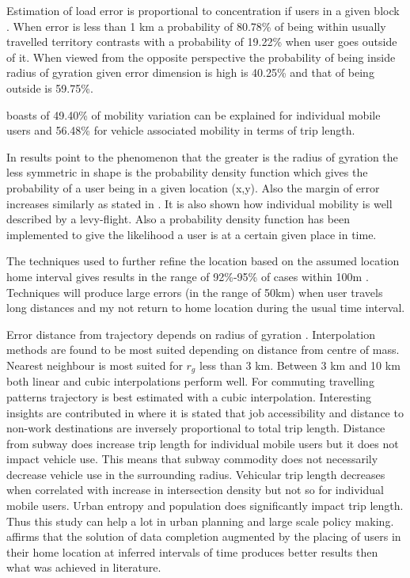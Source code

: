 \documentclass[12pt, a4paper]{report}
\theoremstyle{definition}
\theoremstyle{definition}%
\theoremstyle{definition}%
\theoremstyle{definition}%
\theoremstyle{definition}%
\theoremstyle{definition}%
\begin{document}
Estimation of load error is proportional to concentration if users in a given block \cite{Hoteit2014}. When error is less than 1 km a probability of 80.78\% of being within usually travelled territory contrasts with a probability of 19.22\% when user goes outside of it. When viewed from the opposite perspective the probability of being inside radius of gyration given error dimension is high is 40.25\% and that of being outside is 59.75\%.

\cite{Calabrese2013} boasts of 49.40\% of mobility variation can be explained for individual mobile users and 56.48\% for vehicle associated mobility in terms of trip length.    

In \cite{Gonzalez2008} results point to the phenomenon that the greater is the radius of gyration the less symmetric in shape is the probability density function which gives the probability of a user being in a given location (x,y). Also the margin of error increases similarly as stated in \cite{Hoteit2014}. It is also shown how individual mobility is well described by a levy-flight. Also a probability density function has been implemented to give the likelihood a user is at a certain given place in time.

The techniques used to further refine the location based on the assumed location home interval gives results in the range of 92\%-95\% of cases within 100m \cite{Hoteit2016}. Techniques will produce large errors (in the range of 50km) when user travels long distances and my not return to home location during the usual time interval.

Error distance from trajectory depends on radius of gyration \cite{Hoteit2014}. Interpolation methods are found to be most suited depending on distance from centre of mass. Nearest neighbour is most suited for $r_{g}$ less than 3 km. Between 3 km and 10 km both linear and cubic interpolations perform well. For commuting travelling patterns trajectory is best estimated with a cubic interpolation.
Interesting insights are contributed in \cite{Calabrese2013} where it is stated that job accessibility and distance to non-work destinations are inversely proportional to total trip length. Distance from subway does increase trip length for individual mobile users but it does not impact vehicle use. This means that subway commodity does not necessarily decrease vehicle use in the surrounding radius. Vehicular trip length decreases when correlated with increase in intersection density but not so for individual mobile users. Urban entropy and population does significantly impact trip length. Thus this study can help a lot in urban planning and large scale policy making.
\cite{Hoteit2016} affirms that the solution of data completion augmented by the placing of users in their home location at inferred intervals of time produces better results then what was achieved in literature.
\end{document}
